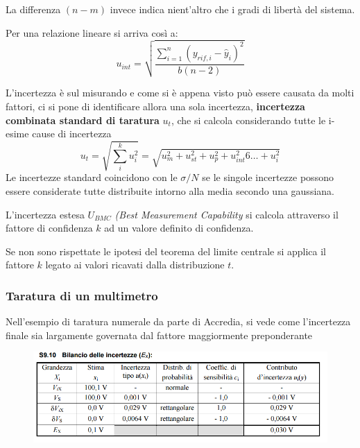 \documentclass[a4paper, 15pt]{article}
\begin{document}
\begin{adjustwidth}{2in}{}
\begin{itemize}
   			La differenza $(n-m)$ invece indica nient'altro che i gradi di libertà del sistema. \newline 
   			
   			Per una relazione lineare si arriva così a:
   			 \[u_{int} = \sqrt{\dfrac{\sum_{i=1}^{n}(y_{rif, i}-\hat{y}_i)^2}{b(n-2)}}\]   			
   		\end{itemize}
\newpage
   		L'incertezza è sul misurando e come si è appena visto può essere causata da molti fattori, ci si pone di identificare allora una sola incertezza, \textbf{incertezza combinata standard di
   			taratura} $u_t$, che si calcola considerando tutte le i-esime cause di incertezza
   		\[u_t = \sqrt{\sum_{i}^{k}u_i^2} = \sqrt{u_m^2 + u_{st}^2 + u_p^2 + u_{int}^2 6 \dots + u_i^2}\]
   		Le incertezze standard coincidono con le $\sigma/N$ se le singole incertezze possono
   		essere considerate tutte distribuite intorno alla media secondo una gaussiana. \newline 
   		
   		L'incertezza estesa $U_{BMC}$ \textit{(Best Measurement
   		Capability} si calcola attraverso il fattore di confidenza $k$ ad un valore definito di confidenza. 
   	
   		Se non sono rispettate le ipotesi del teorema del limite centrale si applica il fattore $k$ legato ai valori ricavati dalla distribuzione $ t $. 
\end{adjustwidth}
\subsubsection{Taratura di un multimetro}
\begin{adjustwidth}{2in}{}    		
   		Nell'esempio di taratura numerale da parte di Accredia, si vede come l'incertezza finale sia largamente governata dal fattore maggiormente preponderante   		
   		\begin{figure}[H]
   			\centering
   			\includegraphics[width=0.5\linewidth]{fig/screenshot013}
   			\label{fig:screenshot013}
   		\end{figure}
\end{adjustwidth}
\end{document}
